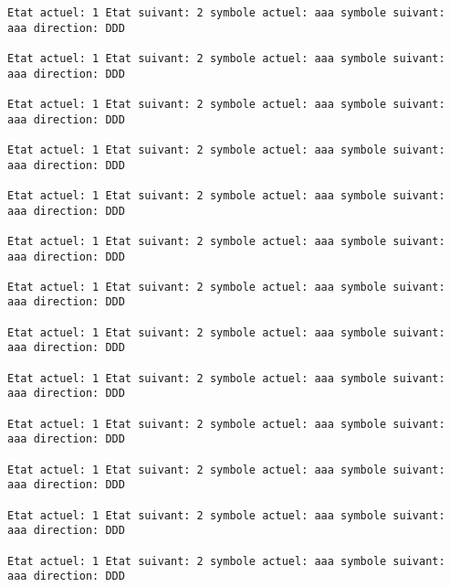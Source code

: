 \documentclass{article}
\begin{document}
\begin{verbatim}
Etat actuel: 1 Etat suivant: 2 symbole actuel: aaa symbole suivant: aaa direction: DDD

Etat actuel: 1 Etat suivant: 2 symbole actuel: aaa symbole suivant: aaa direction: DDD

Etat actuel: 1 Etat suivant: 2 symbole actuel: aaa symbole suivant: aaa direction: DDD

Etat actuel: 1 Etat suivant: 2 symbole actuel: aaa symbole suivant: aaa direction: DDD

Etat actuel: 1 Etat suivant: 2 symbole actuel: aaa symbole suivant: aaa direction: DDD

Etat actuel: 1 Etat suivant: 2 symbole actuel: aaa symbole suivant: aaa direction: DDD

Etat actuel: 1 Etat suivant: 2 symbole actuel: aaa symbole suivant: aaa direction: DDD

Etat actuel: 1 Etat suivant: 2 symbole actuel: aaa symbole suivant: aaa direction: DDD

Etat actuel: 1 Etat suivant: 2 symbole actuel: aaa symbole suivant: aaa direction: DDD

Etat actuel: 1 Etat suivant: 2 symbole actuel: aaa symbole suivant: aaa direction: DDD

Etat actuel: 1 Etat suivant: 2 symbole actuel: aaa symbole suivant: aaa direction: DDD

Etat actuel: 1 Etat suivant: 2 symbole actuel: aaa symbole suivant: aaa direction: DDD

Etat actuel: 1 Etat suivant: 2 symbole actuel: aaa symbole suivant: aaa direction: DDD
\end{verbatim}
\end{document}
